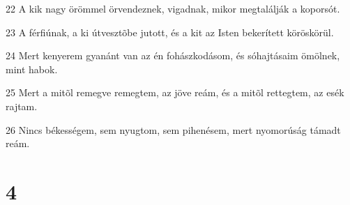 \par 22 A kik nagy örömmel örvendeznek, vigadnak, mikor megtalálják a koporsót.
\par 23 A férfiúnak, a ki útvesztõbe jutott, és a kit az Isten bekerített köröskörül.
\par 24 Mert kenyerem gyanánt van az én fohászkodásom, és sóhajtásaim ömölnek, mint habok.
\par 25 Mert a mitõl remegve remegtem, az jöve reám, és a mitõl rettegtem, az esék rajtam.
\par 26 Nincs békességem, sem nyugtom, sem pihenésem, mert nyomorúság támadt reám.

\chapter{4}

